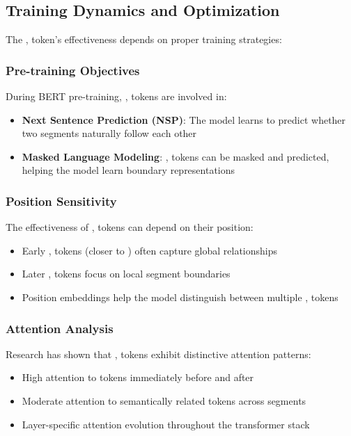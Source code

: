 \subsection{Training Dynamics and Optimization}

The \sep{} token's effectiveness depends on proper training strategies:

\subsubsection{Pre-training Objectives}
During BERT pre-training, \sep{} tokens are involved in:

\begin{itemize}
\item \textbf{Next Sentence Prediction (NSP)}: The model learns to predict whether two segments naturally follow each other
\item \textbf{Masked Language Modeling}: \sep{} tokens can be masked and predicted, helping the model learn boundary representations
\end{itemize}

\subsubsection{Position Sensitivity}
The effectiveness of \sep{} tokens can depend on their position:
\begin{itemize}
\item Early \sep{} tokens (closer to \cls{}) often capture global relationships
\item Later \sep{} tokens focus on local segment boundaries
\item Position embeddings help the model distinguish between multiple \sep{} tokens
\end{itemize}

\subsubsection{Attention Analysis}
Research has shown that \sep{} tokens exhibit distinctive attention patterns:
\begin{itemize}
\item High attention to tokens immediately before and after
\item Moderate attention to semantically related tokens across segments
\item Layer-specific attention evolution throughout the transformer stack
\end{itemize}

